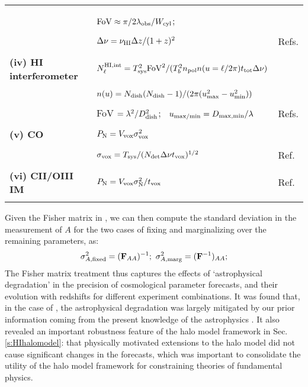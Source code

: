 \begin{longtable}{l|l|l}
   &  &  \\
   & & \\
 & ${\rm FoV} \approx \pi/2 \lambda_{\rm obs}/W_{\rm cyl}$; & \\
 & & \\
 & $\Delta \nu = \nu_{\rm HI} \Delta z/(1+z)^2$ & Refs. \cite{camera2020, newburgh2014, jalilvand2019, obuljen2018}  \\
 & & \\
 {\large \bf (iv)  HI interferometer} & $N_{\ell}^{\rm HI,  int} = T_{\rm sys}^2 {\rm FoV}^2/(T_b^2 n_{\rm pol} n(u = \ell/2\pi)  t_{\rm tot} \Delta \nu)$ & \\
 & & \\
 &  $n(u) = N_{\rm dish} (N_{\rm dish} - 1)/(2 \pi (u_{\rm max}^2 - u_{\rm min}^2))$ & \\
 & & \\
 & FoV $= \lambda^2/D_{\rm dish}^2$; \ $u_{\rm max/min} = D_{\rm max,min}/\lambda$ & Refs. \cite{bauer2021, pourtsidou2016, bull2014}  \\
 & & \\
{\large \bf (v) CO} & $P_{\rm N} = V_{\rm vox} \sigma^2_{\rm vox}$ &  \\
& & \\
 & $\sigma_{\rm vox} = T_{\rm sys}/(N_{\rm det} \Delta \nu t_{\rm vox})^{1/2}$ & Ref. \cite{liu2021} \\
 & & \\
{\large \bf   (vi) CII/OIII IM} &  $P_{\rm N} = V_{\rm vox} \sigma_{\rm N}^2/t_{\rm vox}$ & Ref. \cite{hpcii2019} \\
& &
 \label{table:noise}
 \\
\hline
\end{longtable}
Given the Fisher matrix in , we can then compute the standard deviation in the measurement of $A$ for the two cases of fixing and marginalizing over the remaining parameters, as:
\begin{equation}
   \sigma^2_{A, \rm fixed} = (\mathbf{F}_{AA})^{-1}; \ \sigma^2_{A, \rm marg} = (\mathbf{F}^{-1})_{AA};
\end{equation}
The Fisher matrix treatment thus captures the effects of `astrophysical degradation' in the precision of cosmological parameter forecasts, and their evolution with redshifts for different experiment combinations. It was found that, in the case of \HI, the astrophysical degradation was largely mitigated by our prior information coming from the present knowledge of the astrophysics \cite{hparaa2019}. It also revealed an important robustness feature of the halo model framework in Sec. \ref{s:HIhalomodel}: that physically motivated extensions to the halo model did not cause significant changes in the forecasts, which was important to consolidate the utility of the halo model framework for constraining theories of fundamental physics.

